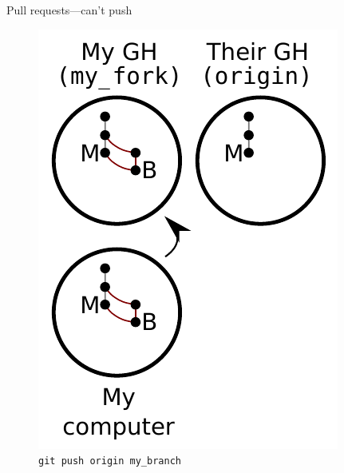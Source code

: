 \begin{frame}{Pull requests---can't push}
  \begin{figure}
    \includegraphics{fork_010.pdf}
    \\ \texttt{git push origin my\_branch}
    \\ \texttt{}
  \end{figure}
\end{frame}

